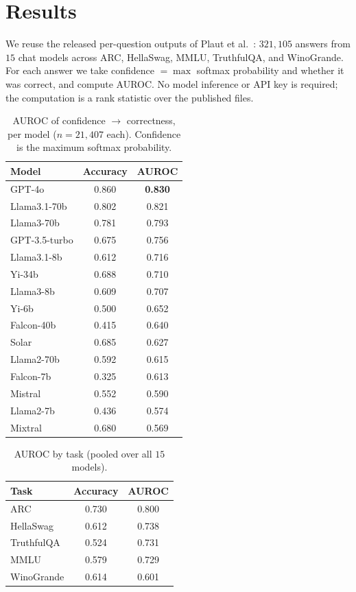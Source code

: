 \documentclass[10pt,twocolumn]{article}
\begin{document}
\section{Results}
\label{sec:results}
We reuse the released per-question outputs of Plaut et
al.~\cite{plaut2025probabilities}: $321{,}105$ answers from $15$ chat models
across ARC, HellaSwag, MMLU, TruthfulQA, and WinoGrande. For each answer we take
confidence $=\max$ softmax probability and whether it was correct, and compute
AUROC. No model inference or API key is required; the computation is a rank
statistic over the published files.

\begin{table}[t]
\centering
\caption{AUROC of confidence $\rightarrow$ correctness, per model
($n=21{,}407$ each). Confidence is the maximum softmax probability.}
\label{tab:models}
\small
\begin{tabular}{lcc}
\toprule
Model & Accuracy & AUROC \\
\midrule
GPT-4o        & 0.860 & \textbf{0.830} \\
Llama3.1-70b  & 0.802 & 0.821 \\
Llama3-70b    & 0.781 & 0.793 \\
GPT-3.5-turbo & 0.675 & 0.756 \\
Llama3.1-8b   & 0.612 & 0.716 \\
Yi-34b        & 0.688 & 0.710 \\
Llama3-8b     & 0.609 & 0.707 \\
Yi-6b         & 0.500 & 0.652 \\
Falcon-40b    & 0.415 & 0.640 \\
Solar         & 0.685 & 0.627 \\
Llama2-70b    & 0.592 & 0.615 \\
Falcon-7b     & 0.325 & 0.613 \\
Mistral       & 0.552 & 0.590 \\
Llama2-7b     & 0.436 & 0.574 \\
Mixtral       & 0.680 & 0.569 \\
\bottomrule
\end{tabular}
\end{table}

\begin{table}[t]
\centering
\caption{AUROC by task (pooled over all $15$ models).}
\label{tab:tasks}
\small
\begin{tabular}{lcc}
\toprule
Task & Accuracy & AUROC \\
\midrule
ARC        & 0.730 & 0.800 \\
HellaSwag  & 0.612 & 0.738 \\
TruthfulQA & 0.524 & 0.731 \\
MMLU       & 0.579 & 0.729 \\
WinoGrande & 0.614 & 0.601 \\
\bottomrule
\end{tabular}
\end{table}
\end{document}
